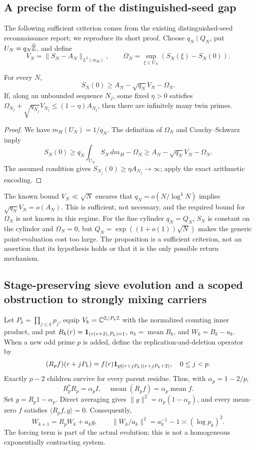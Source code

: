 \subsection{A precise form of the distinguished-seed gap}
The following sufficient criterion comes from the existing distinguished-seed reconnaissance report\cite{archiveseed}; we reproduce its short proof.
Choose $q_N\mid Q_N$, put $U_N=q_N\widehat{\mathbb Z}$, and define
\[
V_N=\|S_N-A_N\|_{L^2(m_H)},\qquad
\Omega_N=\sup_{\xi\in U_N}(S_N(\xi)-S_N(0)).
\]
\begin{proposition}\label{prop:seed}
For every $N$,
\[
S_N(0)\ge A_N-\sqrt{q_N}V_N-\Omega_N.
\]
If, along an unbounded sequence $N_j$, some fixed $\eta>0$ satisfies
$\Omega_{N_j}+\sqrt{q_{N_j}}V_{N_j}\le(1-\eta)A_{N_j}$, then there are infinitely many twin primes.
\end{proposition}
\begin{proof}
We have $m_H(U_N)=1/q_N$. The definition of $\Omega_N$ and Cauchy--Schwarz imply
\[
S_N(0)\ge q_N\int_{U_N}S_N\,dm_H-\Omega_N
\ge A_N-\sqrt{q_N}V_N-\Omega_N.
\]
The assumed condition gives $S_{N_j}(0)\ge\eta A_{N_j}\to\infty$; apply the exact arithmetic encoding.
\end{proof}
The known bound $V_N\ll\sqrt N$ ensures that $q_N=o(N/\log^4N)$ implies
$\sqrt{q_N}V_N=o(A_N)$. This is sufficient, not necessary, and the required bound for $\Omega_N$ is not known in this regime.
For the fine cylinder $q_N=Q_N$, $S_N$ is constant on the cylinder and $\Omega_N=0$, but
$Q_N=\exp((1+o(1))\sqrt N)$ makes the generic point-evaluation cost too large.
The proposition is a sufficient criterion, not an assertion that its hypothesis holds or that it is the only possible return mechanism.

\subsection{Stage-preserving sieve evolution and a scoped obstruction to strongly mixing carriers}
Let $P_k=\prod_{j\le k}p_j$, equip $V_k=\mathbb C^{\mathbb Z/P_k\mathbb Z}$ with the normalized counting inner product, and put
$B_k(r)=\mathbf 1_{(r(r+2),P_k)=1}$, $a_k=\operatorname{mean}B_k$, and $W_k=B_k-a_k$.
When a new odd prime $p$ is added, define the replication-and-deletion operator by
\[
(R_pf)(r+jP_k)=f(r)\mathbf 1_{p\nmid(r+jP_k)(r+jP_k+2)},\quad 0\le j<p.
\]
Exactly $p-2$ children survive for every parent residue. Thus, with $\alpha_p=1-2/p$,
\[
R_p^*R_p=\alpha_p I,\quad \operatorname{mean}(R_pf)=\alpha_p\operatorname{mean}f.
\]
Set $g=R_p1-\alpha_p$. Direct averaging gives $\|g\|^2=\alpha_p(1-\alpha_p)$, and every mean-zero $f$ satisfies $\langle R_pf,g\rangle=0$. Consequently,
\[
W_{k+1}=R_pW_k+a_kg,\qquad \|W_k/a_k\|^2=a_k^{-1}-1\asymp(\log p_k)^2.
\]
The forcing term is part of the actual evolution; this is not a homogeneous exponentially contracting system.

